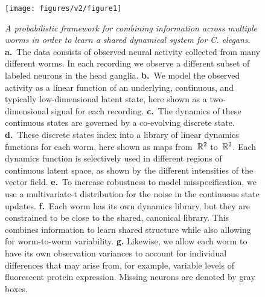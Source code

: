 \documentclass[11pt]{article}
\newcommand{\celegans}{\textit{C. elegans}}
\begin{document}
\begin{figure}[t!]
\centering%
\texttt{[image: figures/v2/figure1]} 
\caption{
  \textit{A probabilistic framework for combining
  information across multiple worms in order to learn a shared
  dynamical system for \celegans.}
  \textbf{a.}~The data consists of observed neural activity collected
  from many different worms.  In each recording we observe a different
  subset of labeled neurons in the head ganglia.
  \textbf{b.}~We model the observed activity as a linear function of
  an underlying, continuous, and typically low-dimensional latent state,
  here shown as a two-dimensional signal for each recording.
  \textbf{c.}~The dynamics of these continuous states are governed by
  a co-evolving discrete state.
  \textbf{d.}~These discrete states index into a library of linear
  dynamics functions for each worm, here shown as maps from~$\mathbb{R}^2$ to~$\mathbb{R}^2$.
  Each dynamics function is selectively used in different regions of
  continuous latent space, as shown by the different intensities of
  the vector field.
  \textbf{e.}~To increase robustness to model misspecification, we
  use a multivariate-t distribution for the noise in the continuous
  state updates.
  \textbf{f.}~Each worm has its own dynamics library, but they are
  constrained to be close to the shared, canonical library.  This
  combines information to learn shared structure while also allowing
  for worm-to-worm variability.
  \textbf{g.} Likewise, we allow each worm to have its own observation
  variances to account for individual differences that may arise from,
  for example, variable levels of fluorescent protein expression.
  Missing neurons are denoted by gray boxes. 
}
\label{fig:model}
\end{figure}
\end{document}
